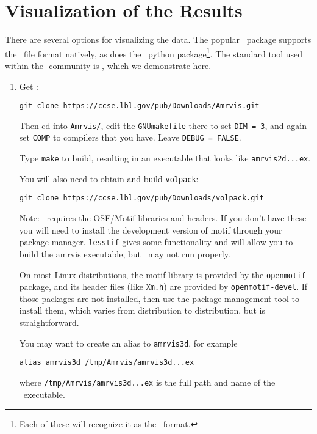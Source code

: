\section{Visualization of the Results}

There are several options for visualizing the data.  The popular
\visit\ package supports the \amrex\ file format natively, as does the
\yt\ python package\footnote{Each of these will recognize it as the
  \boxlib\ format.}.  The standard tool used within the
\boxlib-community is \amrvis, which we demonstrate here.

\begin{enumerate}

\item Get \amrvis:

\begin{verbatim}
git clone https://ccse.lbl.gov/pub/Downloads/Amrvis.git
\end{verbatim}

Then cd into {\tt Amrvis/}, edit the {\tt GNUmakefile} there
to set {\tt DIM = 3}, and again set {\tt COMP} to compilers that
you have. Leave {\tt DEBUG = FALSE}.

Type {\tt make} to build, resulting in an executable that
looks like {\tt amrvis2d...ex}.

You will also need to obtain and build {\tt volpack}:
\begin{verbatim}
git clone https://ccse.lbl.gov/pub/Downloads/volpack.git
\end{verbatim}

Note: \amrvis\ requires the OSF/Motif libraries and headers. If you don't have these 
you will need to install the development version of motif through your package manager. 
{\tt lesstif} gives some functionality and will allow you to build the amrvis executable, 
but \amrvis\ may not run properly.

On most Linux distributions, the motif library is provided by the
{\tt openmotif} package, and its header files (like {\tt Xm.h}) are provided
by {\tt openmotif-devel}. If those packages are not installed, then use the
package management tool to install them, which varies from
distribution to distribution, but is straightforward. 

You may want to create an alias to {\tt amrvis3d}, for example
\begin{verbatim}
alias amrvis3d /tmp/Amrvis/amrvis3d...ex
\end{verbatim}
where {\tt /tmp/Amrvis/amrvis3d...ex} is the full path and name of the \amrvis\ executable.


\end{enumerate}
